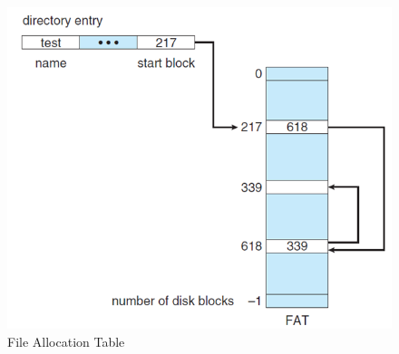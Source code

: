 \documentclass{article}
\theoremstyle{plain}
\theoremstyle{definition}
\begin{document}
\begin{figure}[!h]
    \centering
    \includegraphics[scale=0.5]{os10.png}
    \caption{File Allocation Table}
    \label{fig:my_label_21}
\end{figure}
\end{document}
